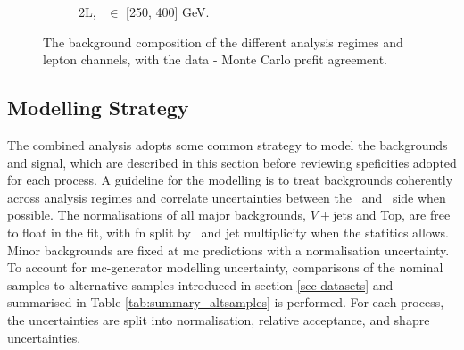 \begin{figure}[h!]
{\begin{subfigure}[b]{0.38\textwidth}
            \caption{2L, \ptv\ $\in$ [250, 400] GeV.}
            \label{fig:backCom_2L_3}
        \end{subfigure} 
    }
    \caption{The background composition of the different analysis regimes and lepton channels, with the data - Monte Carlo prefit agreement.}
    \label{fig:backCom}
\end{figure} 
  
\subsection{Modelling Strategy}\label{sec-modStrat}
The combined analysis adopts some common strategy to model the backgrounds and signal, which are described in this section before reviewing speficities adopted for each process. A guideline for the modelling is to treat backgrounds coherently across analysis regimes and correlate uncertainties between the \vhb\ and \vhc\ side when possible. The normalisations of all major backgrounds, $V+$jets and Top, are free to float in the fit, with \gls{fn} split by \ptv\ and jet multiplicity when the statitics allows. Minor backgrounds are fixed at \gls{mc} predictions with a normalisation uncertainty. To account for \gls{mc}-generator modelling uncertainty, comparisons of the nominal samples to alternative samples introduced in section \ref{sec-datasets} and summarised in Table \ref{tab:summary_altsamples} is performed. For each process, the uncertainties are split into normalisation, relative acceptance, and shapre uncertainties.  %

